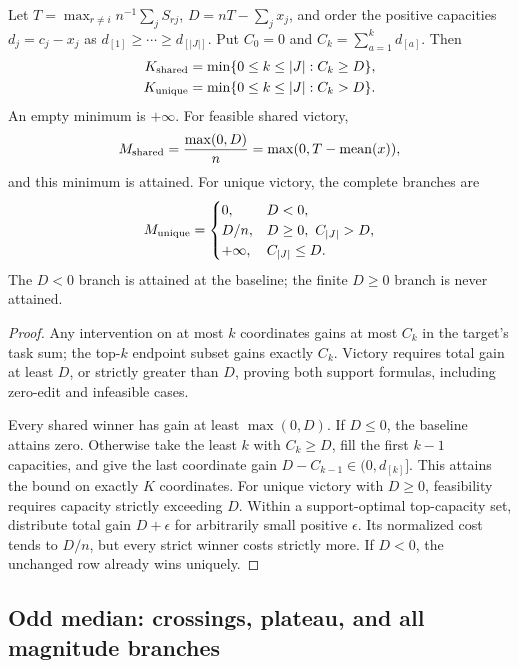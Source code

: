 \begin{appprop}
\label{app:prop:mean}
Let $T=\max_{r\ne i}n^{-1}\sum_jS_{rj}$, $D=nT-\sum_jx_j$, and order the positive capacities $d_j=c_j-x_j$ as $d_{[1]}\geq\cdots\geq d_{[|J|]}$. Put $C_0=0$ and $C_k=\sum_{a=1}^kd_{[a]}$. Then
\begin{align}
 K_{\rm shared}&=\min\{0\leq k\leq|J|:C_k\geq D\},\label{app:meanweak}\\
 K_{\rm unique}&=\min\{0\leq k\leq|J|:C_k>D\}.
 \label{app:meanstrict}
\end{align}
An empty minimum is $+\infty$. For feasible shared victory,
\[
 M_{\rm shared}=\frac{\max(0,D)}n
                 =\max(0,T-\operatorname{mean}(x)),
\]
and this minimum is attained. For unique victory, the complete branches are
\[
 M_{\rm unique}=\begin{cases}
 0,&D<0,\\
 D/n,&D\geq0,\ C_{|J|}>D,\\
 +\infty,&C_{|J|}\leq D.
 \end{cases}
\]
The $D<0$ branch is attained at the baseline; the finite $D\geq0$ branch is never attained.
\end{appprop}
\begin{proof}
Any intervention on at most $k$ coordinates gains at most $C_k$ in the target's task sum; the top-$k$ endpoint subset gains exactly $C_k$. Victory requires total gain at least $D$, or strictly greater than $D$, proving both support formulas, including zero-edit and infeasible cases.

Every shared winner has gain at least $\max(0,D)$. If $D\leq0$, the baseline attains zero. Otherwise take the least $k$ with $C_k\geq D$, fill the first $k-1$ capacities, and give the last coordinate gain $D-C_{k-1}\in(0,d_{[k]}]$. This attains the bound on exactly $K$ coordinates. For unique victory with $D\geq0$, feasibility requires capacity strictly exceeding $D$. Within a support-optimal top-capacity set, distribute total gain $D+\epsilon$ for arbitrarily small positive $\epsilon$. Its normalized cost tends to $D/n$, but every strict winner costs strictly more. If $D<0$, the unchanged row already wins uniquely.
\end{proof}

\subsection{Odd median: crossings, plateau, and all magnitude branches}
\label{app:median}

